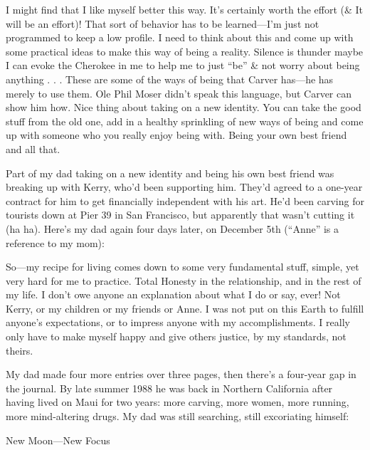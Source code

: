 \documentclass[12pt]{book}
\begin{document}
I might find that I like myself better this way. It's certainly worth the effort (\& It will be an effort)! That sort of behavior has to be learned---I'm just not programmed to keep a low profile. I need to think about this and come up with some practical ideas to make this way of being a reality. Silence is thunder maybe I can evoke the Cherokee in me to help me to just ``be'' \& not worry about being anything . . . These are some of the ways of being that Carver has---he has merely to use them. Ole Phil Moser didn't speak this language, but Carver can show him how. Nice thing about taking on a new identity. You can take the good stuff from the old one, add in a healthy sprinkling of new ways of being and come up with someone who you really enjoy being with. Being your own best friend and all that.

Part of my dad taking on a new identity and being his own best friend was breaking up with Kerry, who'd been supporting him. They'd agreed to a one-year contract for him to get financially independent with his art. He'd been carving for tourists down at Pier 39 in San Francisco, but apparently that wasn't cutting it (ha ha). Here's my dad again four days later, on December 5th (``Anne'' is a reference to my mom):

So---my recipe for living comes down to some very fundamental stuff, simple, yet very hard for me to practice. Total Honesty in the relationship, and in the rest of my life. I don't owe anyone an explanation about what I do or say, ever! Not Kerry, or my children or my friends or Anne. I was not put on this Earth to fulfill anyone's expectations, or to impress anyone with my accomplishments. I really only have to make myself happy and give others justice, by my standards, not theirs.

My dad made four more entries over three pages, then there's a four-year gap in the journal. By late summer 1988 he was back in Northern California after having lived on Maui for two years: more carving, more women, more running, more mind-altering drugs. My dad was still searching, still excoriating himself:

New Moon---New Focus
\end{document}

